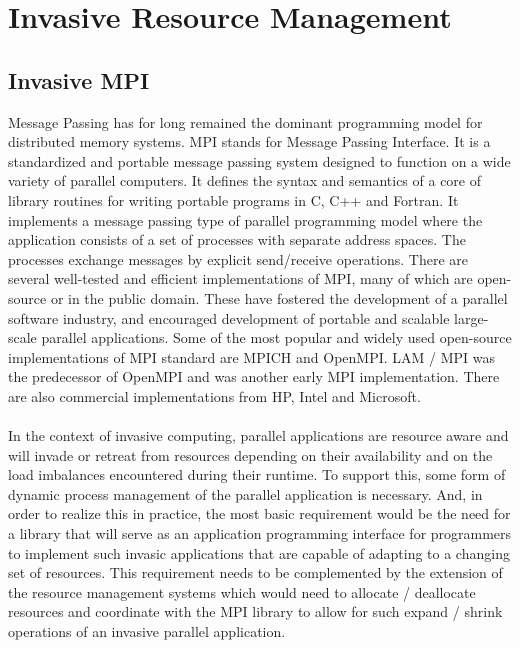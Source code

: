 \section{Invasive Resource Management}
\subsection{Invasive MPI}
Message Passing has for long remained the dominant programming model for distributed memory systems. MPI stands for Message Passing Interface. It is a standardized and portable message passing system designed to function on a wide variety of parallel computers. It defines the syntax and semantics of a core of library routines for writing portable programs in C, C++ and Fortran. It implements a message passing type of parallel programming model where the application consists of a set of processes with separate address spaces. The processes exchange messages by explicit send/receive operations. There are several well-tested and efficient implementations of MPI, many of which are open-source or in the public domain. These have fostered the development of a parallel software industry, and encouraged development of portable and scalable large-scale parallel applications. Some of the most popular and widely used open-source implementations of MPI standard are MPICH and OpenMPI. LAM / MPI was the predecessor of OpenMPI and was another early MPI implementation. There are also commercial implementations from HP, Intel and Microsoft.\\ \\ 
\noindent
In the context of invasive computing, parallel applications are resource aware and will invade or retreat from resources depending on their availability and on the load imbalances encountered during their runtime. To support this, some form of dynamic process management of the parallel application is necessary. And, in order to realize this in practice, the most basic requirement would be the need for a library that will serve as an application programming interface for programmers to implement such invasic applications that are capable of adapting to a changing set of resources. This requirement needs to be complemented by the extension of the resource management systems which would need to allocate / deallocate resources and coordinate with the MPI library to allow for such expand / shrink operations of an invasive parallel application.\\ \\
\noindent
